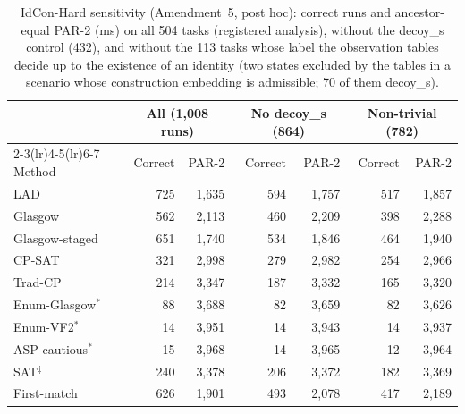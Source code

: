 \begin{table}[t]
\caption{IdCon-Hard sensitivity (Amendment~5, post hoc): correct runs and ancestor-equal PAR-2 (ms) on all 504 tasks (registered analysis), without the \textsf{decoy\_s} control (432), and without the 113 tasks whose label the observation tables decide up to the existence of an identity (two states excluded by the tables in a scenario whose construction embedding is admissible; 70 of them \textsf{decoy\_s}).}
\label{tab:sensitivity}
\centering\footnotesize
\setlength{\tabcolsep}{2.4pt}
\begin{tabular}{lrr rr rr}
\toprule
 & \multicolumn{2}{c}{All (1,008 runs)} & \multicolumn{2}{c}{No \textsf{decoy\_s} (864)} & \multicolumn{2}{c}{Non-trivial (782)}\\
\cmidrule(lr){2-3}\cmidrule(lr){4-5}\cmidrule(lr){6-7}
Method & Correct & PAR-2 & Correct & PAR-2 & Correct & PAR-2\\
\midrule
LAD & 725 & 1,635 & 594 & 1,757 & 517 & 1,857\\
Glasgow & 562 & 2,113 & 460 & 2,209 & 398 & 2,288\\
Glasgow-staged & 651 & 1,740 & 534 & 1,846 & 464 & 1,940\\
CP-SAT & 321 & 2,998 & 279 & 2,982 & 254 & 2,966\\
Trad-CP & 214 & 3,347 & 187 & 3,332 & 165 & 3,320\\
Enum-Glasgow$^\ast$ & 88 & 3,688 & 82 & 3,659 & 82 & 3,626\\
Enum-VF2$^\ast$ & 14 & 3,951 & 14 & 3,943 & 14 & 3,937\\
ASP-cautious$^\ast$ & 15 & 3,968 & 14 & 3,965 & 12 & 3,964\\
SAT$^\ddagger$ & 240 & 3,378 & 206 & 3,372 & 182 & 3,369\\
\midrule
First-match & 626 & 1,901 & 493 & 2,078 & 417 & 2,189\\
\bottomrule
\end{tabular}
\end{table}
